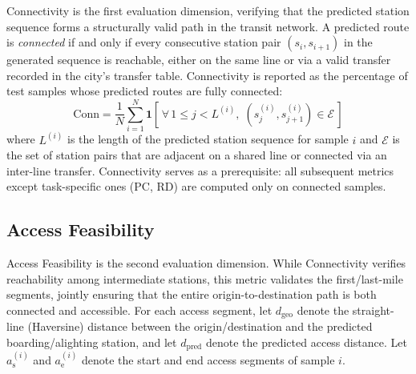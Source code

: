 \documentclass{llmxive}
\begin{document}
Connectivity is the first evaluation dimension, verifying that the predicted station sequence forms a structurally valid path in the transit network. A predicted route is \emph{connected} if and only if every consecutive station pair $(s_i, s_{i+1})$ in the generated sequence is reachable, either on the same line or via a valid transfer recorded in the city's transfer table. Connectivity is reported as the percentage of test samples whose predicted routes are fully connected:
\begin{equation}
\text{Conn} = \frac{1}{N}\sum_{i=1}^{N} \mathbf{1}\!\left[\,\forall\, 1 \leq j < L^{(i)},\; (s_j^{(i)}, s_{j+1}^{(i)}) \in \mathcal{E}\,\right]
\end{equation}
where $L^{(i)}$ is the length of the predicted station sequence for sample $i$ and $\mathcal{E}$ is the set of station pairs that are adjacent on a shared line or connected via an inter-line transfer. Connectivity serves as a prerequisite: all subsequent metrics except task-specific ones (PC, RD) are computed only on connected samples.

\subsection{Access Feasibility}

Access Feasibility is the second evaluation dimension. While Connectivity verifies reachability among intermediate stations, this metric validates the first/last-mile segments, jointly ensuring that the entire origin-to-destination path is both connected and accessible. For each access segment, let $d_{\text{geo}}$ denote the straight-line (Haversine) distance between the origin/destination and the predicted boarding/alighting station, and let $d_{\text{pred}}$ denote the predicted access distance. Let $a_{\mathrm{s}}^{(i)}$ and $a_{\mathrm{e}}^{(i)}$ denote the start and end access segments of sample $i$.
\end{document}
